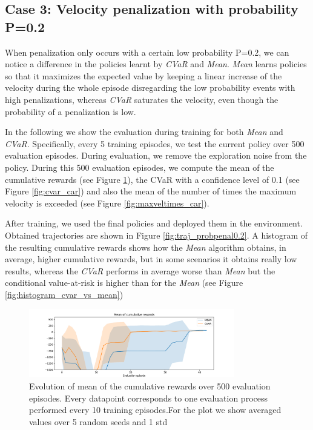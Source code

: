 \newpage
\subsection{Case 3: Velocity penalization with probability P=0.2 }
When penalization only occurs with a certain low probability P=0.2, we can notice a difference
in the policies learnt by \textit{CVaR} and \textit{Mean}.
\textit{Mean} learns policies so that it maximizes the expected
value by keeping a linear increase of the velocity during the whole episode disregarding the low probability events with high penalizations,
whereas \textit{CVaR} saturates the velocity, even though the
probability of a penalization is low.

In the following we show the evaluation during training for both \textit{Mean} and
\textit{CVaR}.
Specifically, every 5 training episodes, we test the current policy over 500 evaluation episodes.
During evaluation, we remove the exploration noise from the policy.
During this 500 evaluation episodes, we compute the mean of the cumulative rewards (see Figure \ref{fig:mean_car}),
the CVaR with a confidence level of 0.1  (see Figure \ref{fig:cvar_car}) and also the mean of the number of times the 
maximum velocity is exceeded  (see Figure \ref{fig:maxveltimes_car}). 

After training, we used the final policies and deployed them in the 
environment. Obtained trajectories are shown in Figure \ref{fig:traj_probpenal0.2}.
A histogram of the resulting cumulative rewards shows
how the \textit{Mean} algorithm obtains, in average, higher cumulative rewards, but in some scenarios it 
obtains really low results, whereas the \textit{CVaR} performs in average worse than \textit{Mean} 
but the conditional value-at-risk is higher than for the \textit{Mean} (see Figure \ref{fig:histogram_cvar_vs_mean})

\begin{figure}[ht]
        \centering
        \includegraphics[width=0.8\textwidth]{images/Car/CVAR/mean_train_withstds.pdf}
        \caption{Evolution of mean of the cumulative rewards over 500 evaluation episodes.
        Every datapoint corresponds
        to one evaluation process performed every 10 training episodes.For the plot we
        show averaged values over 5 random seeds and 1 std}
        \label{fig:mean_car}
    
\end{figure}

